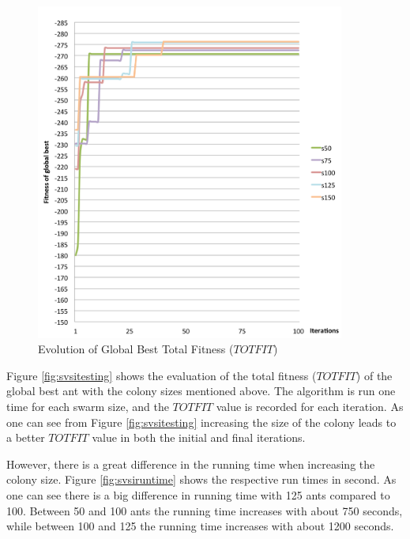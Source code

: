 \begin{figure}[H]
\begin{center}
  \includegraphics[width=4in]{assets/svsitest.png}
  \end{center}
  \caption{Evolution of Global Best Total Fitness ($TOTFIT$)}
  \label{fig:svsitesting} 
\end{figure}

Figure \vref{fig:svsitesting} shows the evaluation of the total fitness ($TOTFIT$) of the global best ant with the colony sizes mentioned above. The algorithm is run one time for each swarm size, and the $TOTFIT$ value is recorded for each iteration. As one can see from Figure \vref{fig:svsitesting} increasing the size of the colony leads to a better $TOTFIT$ value in both the initial and final iterations.  %

However, there is a great difference in the running time when increasing the colony size. Figure \vref{fig:svsiruntime} shows the respective run times in second. As one can see there is a big difference in running time with 125 ants compared to 100. Between 50 and 100 ants the running time increases with about 750 seconds, while between 100 and 125 the running time increases with about 1200 seconds. 


